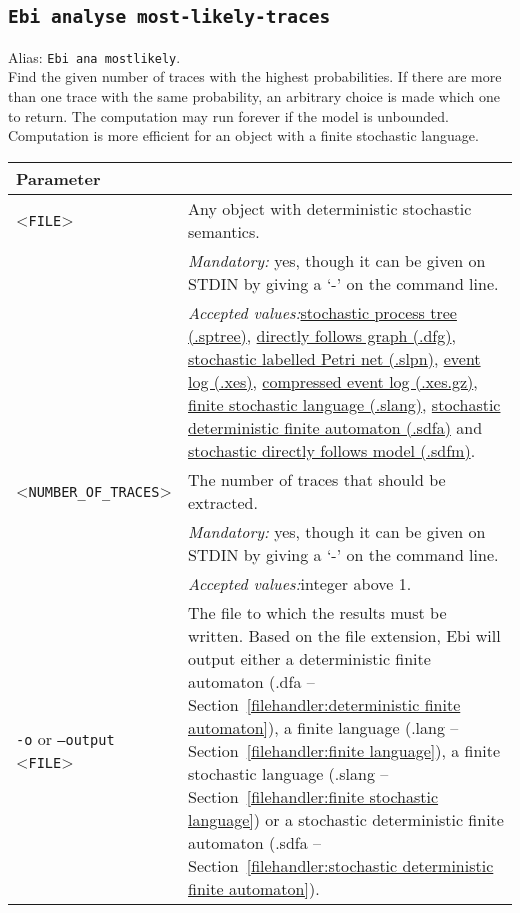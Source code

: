{\subsection{\texttt{Ebi analyse most-likely-traces}}
\label{command:Ebi analyse most-likely-traces}
Alias: \texttt{Ebi ana mostlikely}.\\
Find the given number of traces with the highest probabilities.
If there are more than one trace with the same probability, an arbitrary choice is made which one to return.
The computation may run forever if the model is unbounded.
Computation is more efficient for an object with a finite stochastic language.\\
\begin{tabularx}{\linewidth}{lX}
\toprule
Parameter \\\midrule
<\texttt{FILE}>&Any object with deterministic stochastic semantics.\\
&\textit{Mandatory:} \quad yes, though it can be given on STDIN by giving a `-' on the command line.\\
&\textit{Accepted values:}\quad \hyperref[filehandler:stochastic process tree]{stochastic process tree (.sptree)}, \hyperref[filehandler:directly follows graph]{directly follows graph (.dfg)}, \hyperref[filehandler:stochastic labelled Petri net]{stochastic labelled Petri net (.slpn)}, \hyperref[filehandler:event log]{event log (.xes)}, \hyperref[filehandler:compressed event log]{compressed event log (.xes.gz)}, \hyperref[filehandler:finite stochastic language]{finite stochastic language (.slang)}, \hyperref[filehandler:stochastic deterministic finite automaton]{stochastic deterministic finite automaton (.sdfa)} and \hyperref[filehandler:stochastic directly follows model]{stochastic directly follows model (.sdfm)}.\\
<\texttt{NUMBER\_OF\_TRACES}>&The number of traces that should be extracted.\\
&\textit{Mandatory:} \quad yes, though it can be given on STDIN by giving a `-' on the command line.\\
&\textit{Accepted values:}\quad integer above 1.\\
\texttt{-o} or \texttt{--output} <\texttt{FILE}> &
The file to which the results must be written. Based on the file extension, Ebi will output either a deterministic finite automaton (.dfa -- Section~\ref{filehandler:deterministic finite automaton}), a finite language (.lang -- Section~\ref{filehandler:finite language}), a finite stochastic language (.slang -- Section~\ref{filehandler:finite stochastic language}) or a stochastic deterministic finite automaton (.sdfa -- Section~\ref{filehandler:stochastic deterministic finite automaton}).

\end{tabularx}}

